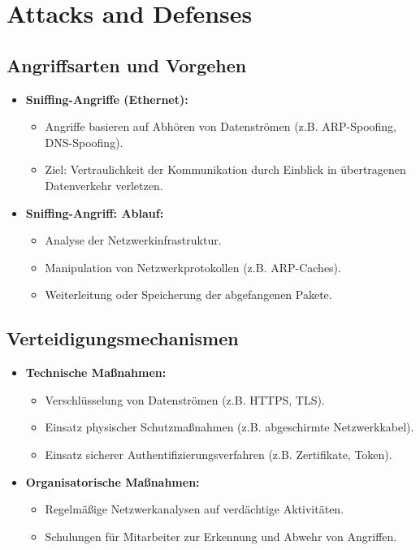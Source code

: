 \documentclass{article}
\begin{document}
\section{Attacks and Defenses}

\subsection{Angriffsarten und Vorgehen}
\begin{itemize}
    \item \textbf{Sniffing-Angriffe (Ethernet):}
    \begin{itemize}
        \item Angriffe basieren auf Abhören von Datenströmen (z.B. ARP-Spoofing, DNS-Spoofing).
        \item Ziel: Vertraulichkeit der Kommunikation durch Einblick in übertragenen Datenverkehr verletzen.
    \end{itemize}
    \item \textbf{Sniffing-Angriff: Ablauf:}
    \begin{itemize}
        \item Analyse der Netzwerkinfrastruktur.
        \item Manipulation von Netzwerkprotokollen (z.B. ARP-Caches).
        \item Weiterleitung oder Speicherung der abgefangenen Pakete.
    \end{itemize}
\end{itemize}

\subsection{Verteidigungsmechanismen}
\begin{itemize}
    \item \textbf{Technische Maßnahmen:}
    \begin{itemize}
        \item Verschlüsselung von Datenströmen (z.B. HTTPS, TLS).
        \item Einsatz physischer Schutzmaßnahmen (z.B. abgeschirmte Netzwerkkabel).
        \item Einsatz sicherer Authentifizierungsverfahren (z.B. Zertifikate, Token).
    \end{itemize}
    \item \textbf{Organisatorische Maßnahmen:}
    \begin{itemize}
        \item Regelmäßige Netzwerkanalysen auf verdächtige Aktivitäten.
        \item Schulungen für Mitarbeiter zur Erkennung und Abwehr von Angriffen.
    \end{itemize}
\end{itemize}
\end{document}

